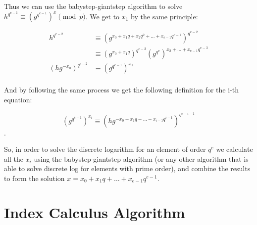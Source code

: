 Thus we can use the babystep-giantstep algorithm to solve $h^{q^{e-1}} \equiv (g^{q^{e-1}})^x \pmod{p}$. We get to $x_1$ by the same principle:

\begin{align*}
  h^{q^{e-2}}
  &\equiv (g^{x_0 + x_1q + x_2q^2 + \dots + x_{e-1}q^{e-1}})^{q^{e-2}} \\
  &\equiv (g^{x_0 + x_1q})^{q^{e-2}}(g^{q^e})^{x_2 + \dots + x_{e-1}q^{e-3}} \\
  (hg^{-x_0})^{q^{e-2}} &\equiv (g^{q^{e-1}})^{x_1} \\
\end{align*}

And by following the same process we get the following definition for the i-th equation:

\[ (g^{q^{e-1}})^{x_i} \equiv (hg^{-x_0 - x_1q - \dots - x_{i-1}q^{i-1}})^{q^{e-i-1}}\].

So, in order to solve the discrete logarithm for an element of order $q^e$ we calculate all the $x_i$ using the babystep-giantstep algorithm (or any other algorithm that is able to solve discrete log for elements with prime order), and combine the results to form the solution $x = x_0 + x_1q + \dots + x_{e-1}q^{e-1}$.

\section{Index Calculus Algorithm}